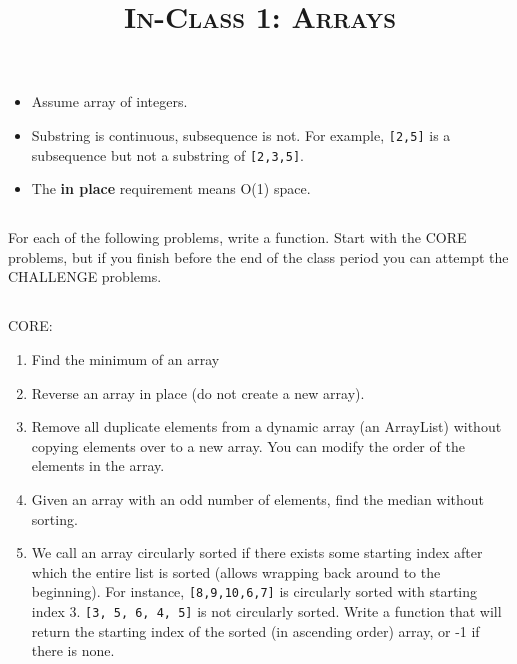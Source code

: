 \documentclass{article}
\title{\large{\textsc{In-Class 1: Arrays}}}
\date{}
\begin{document}
\maketitle

\begin{itemize}
    \item Assume array of integers.
    
    \item Substring is continuous, subsequence is not. For example, \texttt{[2,5]} is a subsequence but not a substring of \texttt{[2,3,5]}.
    
    \item The \textbf{in place} requirement means O(1) space.
\end{itemize}

\subsection*{}

For each of the following problems, write a function. Start with the CORE problems, but if you finish before the end of the class period you can attempt the CHALLENGE problems.

\subsection*{}

CORE:

\begin{enumerate}

    \item Find the minimum of an array
    
    \item Reverse an array in place (do not create a new array).
    
    \item Remove all duplicate elements from a dynamic array (an ArrayList) without copying elements over to a new array. You can modify the order of the elements in the array.

    \item Given an array with an odd number of elements, find the median without sorting.
    
    \item We call an array circularly sorted if there exists some starting index after which the entire list is sorted (allows wrapping back around to the beginning). For instance, \texttt{[8,9,10,6,7]} is circularly sorted with starting index 3. \texttt{[3, 5, 6, 4, 5]} is not circularly sorted. Write a function that will return the starting index of the sorted (in ascending order) array, or -1 if there is none.
\end{enumerate}
    
\end{document}
